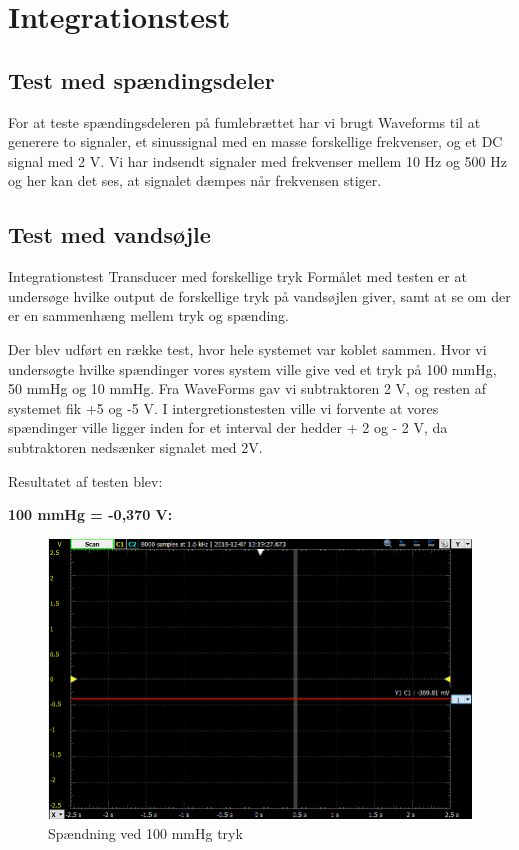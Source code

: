 \section{Integrationstest}
\subsection{Test med spændingsdeler}
For at teste spændingsdeleren på fumlebrættet har vi brugt Waveforms til at generere to signaler, et sinussignal med en masse forskellige
frekvenser, og et DC signal med 2 V.  Vi har indsendt signaler med frekvenser mellem 10 Hz og 500 Hz og her kan det ses, at signalet dæmpes når frekvensen stiger. 



\subsection{Test med vandsøjle}
Integrationstest
Transducer med forskellige tryk
Formålet med testen er at undersøge hvilke output de forskellige tryk på vandsøjlen giver, samt at se om der er en sammenhæng mellem tryk og spænding.

Der blev udført en række test, hvor hele systemet var koblet sammen. Hvor vi undersøgte hvilke spændinger vores system ville give ved et tryk på 100 mmHg, 50 mmHg og 10 mmHg.  Fra WaveForms gav vi subtraktoren 2 V, og resten af systemet fik +5 og -5 V. I intergretionstesten ville vi forvente at vores spændinger ville ligger inden for et interval der hedder + 2 og - 2 V, da subtraktoren nedsænker signalet med 2V.

Resultatet af testen blev:

\vspace{0.2 cm}

\textbf{100 mmHg  =  -0,370 V:}

\vspace{0.2 cm}

\begin{figure}[h!]
	\centering
	\includegraphics[width=1\linewidth]{Hardwaredesign/mmHg100}
	\caption{Spændning ved 100 mmHg tryk}
	\label{fig:100mmHg}
\end{figure}

